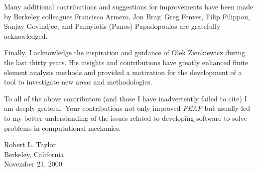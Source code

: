 Many additional contributions and suggestions for improvements
have been made by Berkeley colleagues
Francisco Armero, Jon Bray, Greg Fenves, Filip Filippou, Sanjay Govindjee, and
Panayiotis (Panos) Papadopoulos are gratefully acknowledged.

Finally, I acknowledge the inspiration and guidance of Olek Zienkiewicz during
the last thirty years.  His insights and contributions have greatly enhanced
finite element analysis methods and provided a motivation for the development
of a tool to investigate new areas and methodologies.

To all of the above contributors (and those I have inadvertently failed to
cite) I am deeply grateful.  Your contributions not only improved {\sl FEAP} but
usually led to my better understanding of the issues related to
developing software to solve problems in computational mechanics.

\vspace{0.2in}
\noindent
Robert L. Taylor \\
Berkeley, California \\
November 21, 2000

